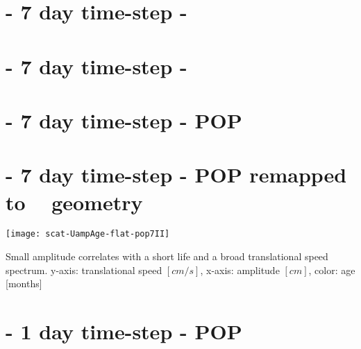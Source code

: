 \label{chap:results}


\section{\MI\;- 7 day time-step - \AVI~}
\label{section:aviI}

\FloatBarrier

\section{\MII\;- 7 day time-step - \AVI~}
\label{section:aviII}

\FloatBarrier

\section{\MII\;- 7 day time-step - POP}
\label{section:pop7II}

\FloatBarrier

\section{\MII\;- 7 day time-step - POP remapped to \AVI~ geometry}
\label{section:p2aII}

\FloatBarrier

\begin{marginfigure}
		\texttt{[image: scat-UampAge-flat-pop7II]}
		\caption{\RUN Small amplitude correlates with a short life and a broad translational speed spectrum. y-axis: translational speed $[cm/s]$, x-axis: amplitude $[cm]$, color: age [months] }
		\label{fig:scat-UampAge-flat-pop7II}
\end{marginfigure}


\section{\MII\;- 1 day time-step - POP}
\label{section:popOneIISO}

\FloatBarrier

